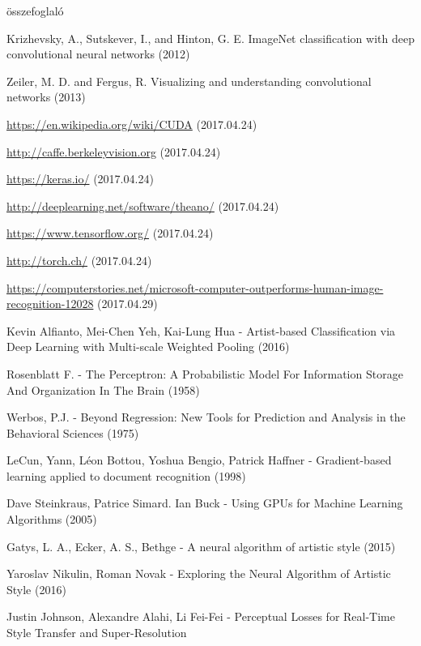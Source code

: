 \documentclass[12pt, a4paper, oneside]{book}
\theoremstyle{tetel}
\begin{document}
összefoglaló

\newpage
 \listoffigures


\newpage
\begin{thebibliography}{1}

Krizhevsky, A., Sutskever, I., and Hinton, G. E. ImageNet classification with deep convolutional neural networks (2012)

Zeiler, M. D. and Fergus, R. Visualizing and understanding convolutional networks (2013)

\url {https://en.wikipedia.org/wiki/CUDA} (2017.04.24)

\url {http://caffe.berkeleyvision.org} (2017.04.24)

\url {https://keras.io/} (2017.04.24)

\url {http://deeplearning.net/software/theano/} (2017.04.24)

\url {https://www.tensorflow.org/} (2017.04.24)

\url {http://torch.ch/} (2017.04.24)

\url {https://computerstories.net/microsoft-computer-outperforms-human-image-recognition-12028} (2017.04.29)

Kevin Alfianto, Mei-Chen Yeh, Kai-Lung Hua - Artist-based Classification via Deep Learning with Multi-scale Weighted Pooling (2016)

Rosenblatt F. - The Perceptron: A Probabilistic Model For Information Storage And Organization In The Brain (1958)

Werbos, P.J. - Beyond Regression: New Tools for Prediction and Analysis in the Behavioral Sciences (1975)
 
LeCun, Yann, Léon Bottou, Yoshua Bengio, Patrick Haffner - Gradient-based learning applied to document recognition (1998)

Dave Steinkraus, Patrice Simard. Ian Buck - Using GPUs for Machine Learning Algorithms (2005)

Gatys, L. A., Ecker, A. S., Bethge - A neural algorithm of artistic style (2015)

Yaroslav Nikulin, Roman Novak - Exploring the Neural Algorithm of Artistic Style (2016)

Justin Johnson, Alexandre Alahi, Li Fei-Fei - Perceptual Losses for Real-Time Style Transfer and Super-Resolution


\end{thebibliography}
\end{document}
